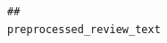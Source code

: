 \documentclass[
  a4paper,
]{article}
\begin{document}
\begin{verbatim}
##                                                                                                                                                                                                                                                                                                                                                                                                                                                                                                                                                                                                                                                                                                                                                                                                                                                                                                                                                                                                                                                                                                                                                                                                                                                                                                                                                                                                                                                                                                                                                                                                                                                                                                                                                                  preprocessed_review_text

\end{verbatim}
\end{document}
